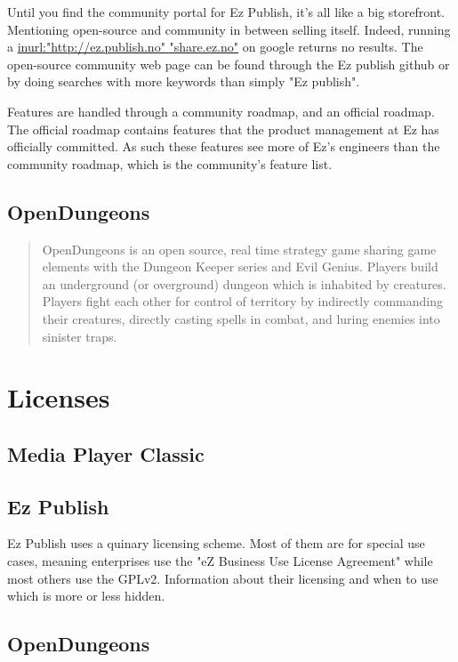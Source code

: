 \documentclass{report} %
\begin{document}
Until you find the community portal for Ez Publish, it's all like a big storefront. Mentioning open-source and community in between selling itself. Indeed, running a \url{inurl:"http://ez.publish.no" "share.ez.no"} on google returns no results. The open-source community web page\cite{ezcomweb} can be found through the Ez publish github\cite{ezpubgithub} or by doing searches with more keywords than simply "Ez publish".

Features are handled through a community roadmap, and an official roadmap. The official roadmap contains features that the product management at Ez has officially committed. As such these features see more of Ez's engineers than the community roadmap, which is the community's feature list.

\subsection{OpenDungeons}
\begin{quotation}
OpenDungeons is an open source, real time strategy game sharing game elements with the Dungeon Keeper series and Evil Genius. Players build an underground (or overground) dungeon which is inhabited by creatures. Players fight each other for control of territory by indirectly commanding their creatures, directly casting spells in combat, and luring enemies into sinister traps.\cite{odwebabout}
\end{quotation}


\section{Licenses}
\subsection{Media Player Classic}
\subsection{Ez Publish}
Ez Publish uses a quinary licensing scheme\cite{ezpubweblicenses}. Most of them are for special use cases, meaning enterprises use the "eZ Business Use License Agreement" while most others use the GPLv2\cite{gplv2}. Information about their licensing and when to use which is more or less hidden.
\subsection{OpenDungeons}
\end{document}

